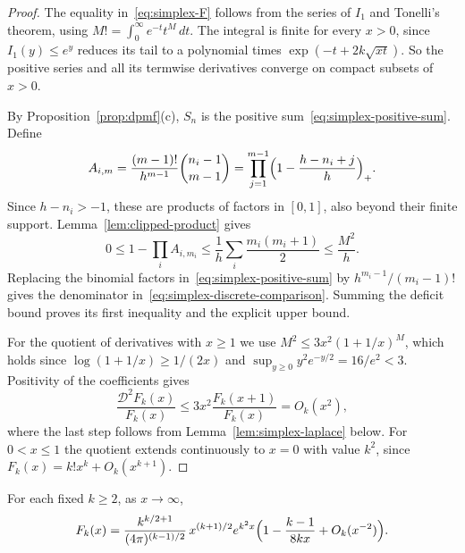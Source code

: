 \begin{proof}
The equality in~\eqref{eq:simplex-F} follows from the series of $I_1$ and
Tonelli's theorem, using $M!=\int_0^\infty e^{-t}t^M\,dt$. The integral is finite
for every $x>0$, since $I_1(y)\le e^y$ reduces its tail to a polynomial times
$\exp(-t+2k\sqrt{xt})$. So the positive series and all its termwise derivatives
converge on compact subsets of $x>0$.

By Proposition~\ref{prop:dpmf}(c), $S_n$ is the positive
sum~\eqref{eq:simplex-positive-sum}. Define
\[
A_{i,m}=\frac{(m-1)!}{h^{m-1}}\binom{n_i-1}{m-1}
=\prod_{j=1}^{m-1}\Bigl(1-\frac{h-n_i+j}{h}\Bigr)_+ .
\]
Since $h-n_i>-1$, these are products of factors in $[0,1]$, also beyond their
finite support. Lemma~\ref{lem:clipped-product} gives
\[
0\le1-\prod_iA_{i,m_i}\le\frac1h\sum_i\frac{m_i(m_i+1)}2\le\frac{M^2}{h}.
\]
Replacing the binomial factors in~\eqref{eq:simplex-positive-sum} by
$h^{m_i-1}/(m_i-1)!$ gives the denominator
in~\eqref{eq:simplex-discrete-comparison}. Summing the deficit bound proves its
first inequality and the explicit upper bound.

For the quotient of derivatives with $x\ge1$ we use $M^2\le3x^2(1+1/x)^M$, which
holds since $\log(1+1/x)\ge1/(2x)$ and $\sup_{y\ge0}y^2e^{-y/2}=16/e^2<3$.
Positivity of the coefficients gives
\[
\frac{\mathcal D^2F_k(x)}{F_k(x)}\le3x^2\frac{F_k(x+1)}{F_k(x)}=O_k(x^2),
\]
where the last step follows from Lemma~\ref{lem:simplex-laplace} below. For
$0<x\le1$ the quotient extends continuously to $x=0$ with value $k^2$, since
$F_k(x)=k!x^k+O_k(x^{k+1})$.
\end{proof}

\begin{lemma}\label{lem:simplex-laplace}
For each fixed $k\ge2$, as $x\to\infty$,
\begin{equation}\label{eq:simplex-laplace}
F_k(x)=\frac{k^{k/2+1}}{(4\pi)^{(k-1)/2}}\,x^{(k+1)/2}e^{k^2x}
\Bigl(1-\frac{k-1}{8kx}+O_k(x^{-2})\Bigr).
\end{equation}
\end{lemma}

